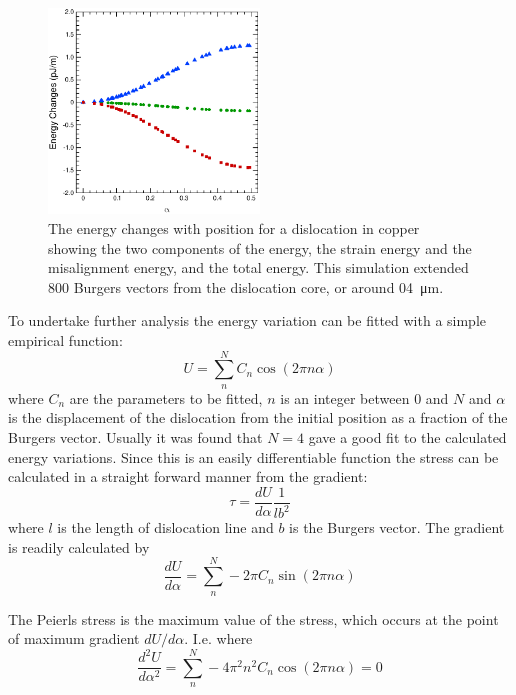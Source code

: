 \begin{figure}
\centering
\includegraphics[width=0.5\textwidth]{Copper_800_rel_energies}
\caption[The energy changes with dislocation position for  copper.]{The energy changes with position for a dislocation in copper showing the two components of the energy, the strain energy and the misalignment energy, and the total energy. This simulation extended \num{800} Burgers vectors from the dislocation core, or around \SI{04}{\micro\meter}.\label{fig:copper_800_rel_energies}}
\end{figure}




To undertake further analysis the energy variation can be fitted with a simple empirical function:
\begin{equation}
U = \sum^N_n C_n \cos (2 \pi n \alpha) \label{eqn:empirical_function}
\end{equation}
where $C_n$ are the parameters to be fitted, $n$ is an integer between $0$ and $N$ and $\alpha$ is the displacement of the dislocation from the initial position as a fraction of the Burgers vector. Usually it was found that $N=4$ gave a good fit to the calculated energy variations. Since this is an easily differentiable function the stress can be calculated in a straight forward manner from the gradient:
\begin{equation}
\tau = \frac{dU}{d\alpha} \frac{1}{lb^2}
\end{equation}
where $l$ is the length of dislocation line and $b$ is the Burgers vector. The gradient is readily calculated by
\begin{equation}
\frac{dU}{d\alpha} = \sum_n^N - 2 \pi C_n \sin ( 2 \pi n \alpha )
\end{equation}

The Peierls stress is the maximum value of the stress, which occurs at the point of maximum gradient $dU/d\alpha$. I.e. where
\begin{equation}
\frac{d^2U}{d\alpha^2} = \sum_n^N -4 \pi^2 n^2 C_n \cos ( 2 \pi n \alpha ) = 0
\end{equation}

